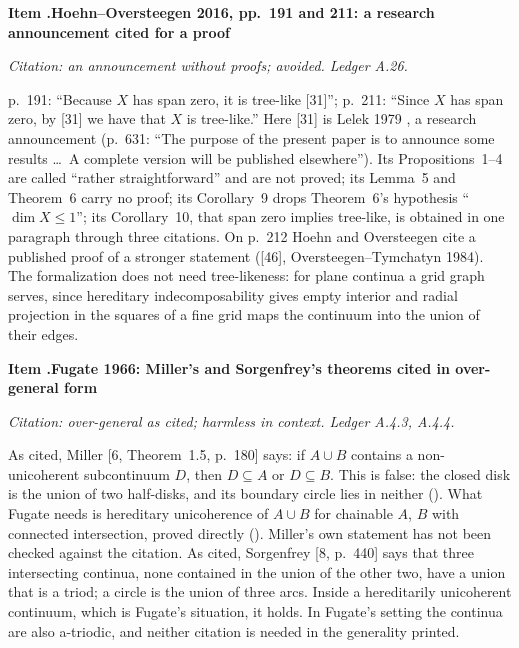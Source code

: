 \documentclass[11pt]{article}
\newcounter{defect}
\newenvironment{defect}[4]{%
  \par\addvspace{10pt}\refstepcounter{defect}%
  \noindent\textbf{Item \thedefect.\enspace #1}\par\nopagebreak
  \noindent\textit{#2}\par\nopagebreak\smallskip}{\par\addvspace{6pt}}
\begin{document}
\begin{defect}{Hoehn--Oversteegen 2016, pp.~191 and 211: a research announcement cited for a
proof}{Citation: an announcement without proofs; avoided. Ledger A.26.}{0}{0}\label{it:lelek}
p.~191: ``Because $X$ has span zero, it is tree-like [31]''; p.~211: ``Since $X$ has span zero, by
[31] we have that $X$ is tree-like.'' Here [31] is Lelek 1979 \cite{Le79}, a research announcement
(p.~631: ``The purpose of the present paper is to announce some results \ldots\ A complete version
will be published elsewhere''). Its Propositions~1--4 are called ``rather straightforward'' and
are not proved; its Lemma~5 and Theorem~6 carry no proof; its Corollary~9 drops
Theorem~6's hypothesis ``$\dim X\le1$''; its Corollary~10, that span zero implies tree-like, is
obtained in one paragraph through three citations. On p.~212 Hoehn and Oversteegen cite a published
proof of a stronger statement ([46], Oversteegen--Tymchatyn 1984). The formalization does not need
tree-likeness: for plane continua a grid graph serves, since hereditary indecomposability gives
empty interior and radial projection in the squares of a fine grid maps the continuum into the
union of their edges.
\end{defect}

\begin{defect}{Fugate 1966: Miller's and Sorgenfrey's theorems cited in over-general
form}{Citation: over-general as cited; harmless in context. Ledger A.4.3, A.4.4.}{0}{0}\label{it:fugate-cite}
As cited, Miller [6, Theorem~1.5, p.~180] says: if $A\cup B$ contains a non-unicoherent subcontinuum
$D$, then $D\subseteq A$ or $D\subseteq B$. This is false: the closed disk is the union of two
half-disks, and its boundary circle lies in neither (). What Fugate needs is
hereditary unicoherence of $A\cup B$ for chainable $A$, $B$ with connected intersection, proved
directly (). Miller's own statement has not been checked
against the citation. As cited, Sorgenfrey [8, p.~440] says that three intersecting continua, none
contained in the union of the other two, have a union that is a triod; a circle is the union of
three arcs. Inside a hereditarily unicoherent continuum, which is Fugate's situation, it holds.
In Fugate's setting the continua are also a-triodic, and neither citation is needed in the
generality printed.
\end{defect}
\end{document}
